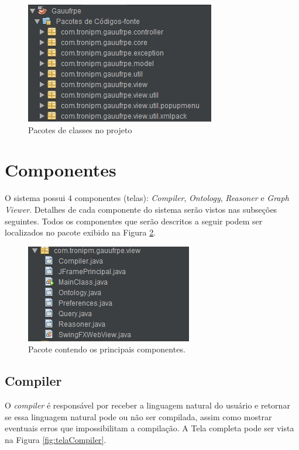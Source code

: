 \documentclass{bcc}
\begin{document}
\begin{figure}[H]
\centering
\includegraphics[width=.6\textwidth]{Figuras/estrutura.png}
\caption{Pacotes de classes no projeto}
\label{fig:pacotesJava}
\end{figure}

\section{Componentes}
O sistema possui 4 componentes (telas): \textit{Compiler}, \textit{Ontology}, \textit{Reasoner} e \textit{Graph Viewer}. Detalhes de cada componente do sistema serão vistos nas subseções seguintes. Todos os componentes que serão descritos a seguir podem ser localizados no pacote exibido na Figura \ref{fig:pacotesView}. 

\begin{figure}[H]
\centering
\includegraphics[width=.6\textwidth]{Figuras/pacote_view.png}
\caption{Pacote contendo os principais componentes.}
\label{fig:pacotesView}
\end{figure}

\subsection{Compiler}

O \textit{compiler} é responsável por receber a linguagem natural do usuário e retornar se essa linguagem natural pode ou não ser compilada, assim como mostrar eventuais erros que impossibilitam a compilação. A Tela completa pode ser vista na Figura \ref{fig:telaCompiler}.
\end{document}
